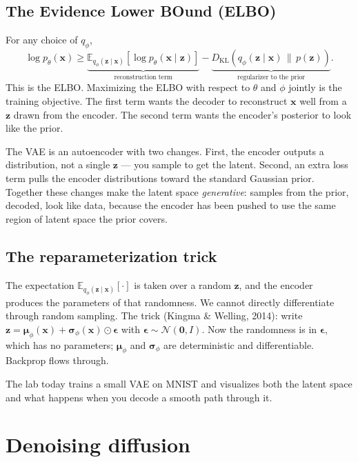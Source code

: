 \subsection{The Evidence Lower BOund (ELBO)}

For any choice of $q_\phi$,
\[
\log p_\theta(\bm{x}) \geq \underbrace{\mathbb{E}_{q_\phi(\bm{z} \mid \bm{x})}\!\left[ \log p_\theta(\bm{x} \mid \bm{z}) \right]}_{\text{reconstruction term}} - \underbrace{D_{\mathrm{KL}}(q_\phi(\bm{z} \mid \bm{x}) \,\|\, p(\bm{z}))}_{\text{regularizer to the prior}}.
\]
This is the ELBO. Maximizing the ELBO with respect to $\theta$ and $\phi$ jointly is the training objective. The first term wants the decoder to reconstruct $\bm{x}$ well from a $\bm{z}$ drawn from the encoder. The second term wants the encoder's posterior to look like the prior.

\begin{intuition}
The VAE is an autoencoder with two changes. First, the encoder outputs a distribution, not a single $\bm{z}$ --- you sample to get the latent. Second, an extra loss term pulls the encoder distributions toward the standard Gaussian prior. Together these changes make the latent space \emph{generative}: samples from the prior, decoded, look like data, because the encoder has been pushed to use the same region of latent space the prior covers.
\end{intuition}

\subsection{The reparameterization trick}

The expectation $\mathbb{E}_{q_\phi(\bm{z} \mid \bm{x})}[\cdot]$ is taken over a random $\bm{z}$, and the encoder produces the parameters of that randomness. We cannot directly differentiate through random sampling. The trick (Kingma \& Welling, 2014): write $\bm{z} = \bm{\mu}_\phi(\bm{x}) + \bm{\sigma}_\phi(\bm{x}) \odot \bm{\epsilon}$ with $\bm{\epsilon} \sim \mathcal{N}(\bm{0}, I)$. Now the randomness is in $\bm{\epsilon}$, which has no parameters; $\bm{\mu}_\phi$ and $\bm{\sigma}_\phi$ are deterministic and differentiable. Backprop flows through.

The lab today trains a small VAE on MNIST and visualizes both the latent space and what happens when you decode a smooth path through it.

\section{Denoising diffusion}

